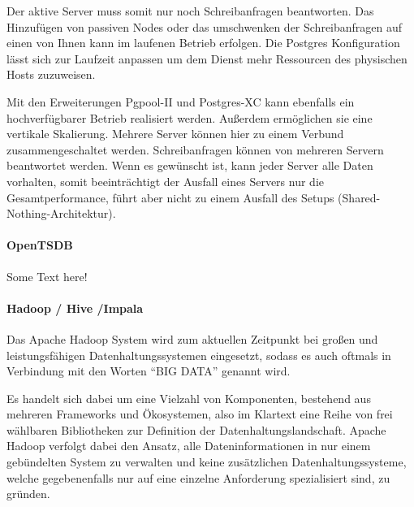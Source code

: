 Der aktive Server muss somit nur noch Schreibanfragen beantworten. Das
Hinzufügen von passiven Nodes oder das umschwenken der Schreibanfragen auf
einen von Ihnen kann im laufenen Betrieb erfolgen. Die Postgres Konfiguration
lässt sich zur Laufzeit anpassen um dem Dienst mehr Ressourcen des physischen
Hosts zuzuweisen.

Mit den Erweiterungen \gls{Pgpool-II} und \gls{Postgres-XC} kann ebenfalls ein
hochverfügbarer Betrieb realisiert werden. Außerdem ermöglichen sie eine
vertikale \gls{Skalierung}. Mehrere Server können hier zu einem Verbund
zusammengeschaltet werden. Schreibanfragen können von mehreren Servern
beantwortet werden. Wenn es gewünscht ist, kann jeder Server alle Daten
vorhalten, somit beeinträchtigt der Ausfall eines Servers nur die
Gesamtperformance, führt aber nicht zu einem Ausfall des Setups
(Shared-Nothing-Architektur).
\tm%

\paragraph{OpenTSDB}
\label{paragraph:opentsdb}
Some Text here!
\nl%

\paragraph{Hadoop / Hive /Impala}
\label{paragraph:hadoop_hive_impala}
Das Apache Hadoop System wird zum aktuellen Zeitpunkt bei
großen und leistungsfähigen Datenhaltungssystemen eingesetzt, sodass es
auch oftmals in Verbindung mit den Worten ``BIG DATA'' genannt wird.

Es handelt sich dabei um eine Vielzahl von Komponenten, bestehend aus mehreren
Frameworks und Ökosystemen, also im Klartext eine Reihe von frei wählbaren
Bibliotheken zur Definition der Datenhaltungslandschaft. Apache Hadoop verfolgt
dabei den Ansatz, alle Dateninformationen in nur einem gebündelten System zu
verwalten und keine zusätzlichen Datenhaltungssysteme, welche gegebenenfalls
nur auf eine einzelne Anforderung spezialisiert sind, zu gründen.

